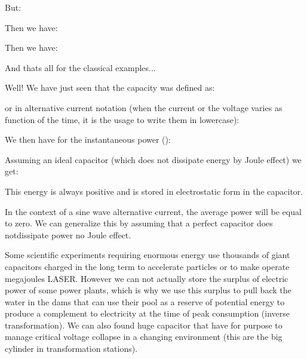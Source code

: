 	But:
	
	Then we have:
	
	Then we have:
	
	And thats all for the classical examples...
	
	Well! We have just seen that the capacity was defined as:
	
	or in alternative current notation (when the current or the voltage varies as function of the time, it is the usage to write them in lowercase):
	
	We then have for the instantaneous power ():	
	
	Assuming an ideal capacitor (which does not dissipate energy by Joule effect) we get:
	
	
	This energy is always positive and is stored in electrostatic form in the capacitor.
	
	In the context of a sine wave alternative current, the average power will be equal to zero. We can generalize this by assuming that a perfect capacitor does notdissipate power no Joule effect.
	\begin{tcolorbox}[title=Remark,colframe=black,arc=10pt]
	Some scientific experiments requiring enormous energy use thousands of giant capacitors charged in the long term to accelerate particles or to make operate megajoules LASER. However we can not actually store the surplus of electric power of some power plants, which is why we use this surplus to pull back the water in the dams that can use their pool as a reserve of potential energy to produce a complement to electricity at the time of peak consumption (inverse transformation). We can also found huge capacitor that have for purpose to manage critical voltage collapse in a changing environment (this are the big cylinder in transformation stations).
	\end{tcolorbox}
	
	
